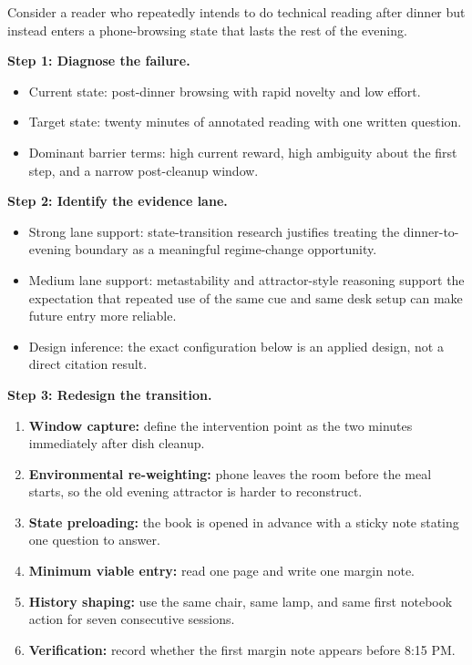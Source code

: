 \begin{example}
Consider a reader who repeatedly intends to do technical reading after dinner
but instead enters a phone-browsing state that lasts the rest of the evening.

\textbf{Step 1: Diagnose the failure.}
\begin{itemize}[nosep]
  \item Current state: post-dinner browsing with rapid novelty and low effort.
  \item Target state: twenty minutes of annotated reading with one written
        question.
  \item Dominant barrier terms: high current reward, high ambiguity about the
        first step, and a narrow post-cleanup window.
\end{itemize}

\textbf{Step 2: Identify the evidence lane.}
\begin{itemize}[nosep]
  \item Strong lane support: state-transition research justifies treating the
        dinner-to-evening boundary as a meaningful regime-change opportunity.
  \item Medium lane support: metastability and attractor-style reasoning
        support the expectation that repeated use of the same cue and same desk
        setup can make future entry more reliable.
  \item Design inference: the exact configuration below is an applied design,
        not a direct citation result.
\end{itemize}

\textbf{Step 3: Redesign the transition.}
\begin{enumerate}[nosep]
  \item \textbf{Window capture:} define the intervention point as the two
        minutes immediately after dish cleanup.
  \item \textbf{Environmental re-weighting:} phone leaves the room before the
        meal starts, so the old evening attractor is harder to reconstruct.
  \item \textbf{State preloading:} the book is opened in advance with a sticky
        note stating one question to answer.
  \item \textbf{Minimum viable entry:} read one page and write one margin note.
  \item \textbf{History shaping:} use the same chair, same lamp, and same first
        notebook action for seven consecutive sessions.
  \item \textbf{Verification:} record whether the first margin note appears
        before 8:15 PM.
\end{enumerate}


\end{example}
